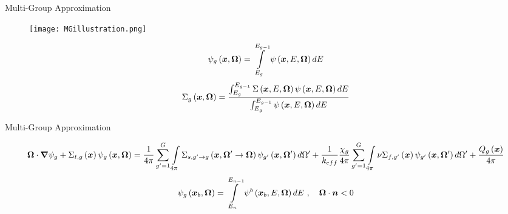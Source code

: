 
\begin{frame}[t]{Multi-Group Approximation}   
  
  \begin{figure}[h]
    \centering
    \texttt{[image: MGillustration.png]}
  \end{figure}
    \begin{equation*}
    \psi_g\left(\bm x, \bm \Omega\right) = \intop_{E_g}^{E_{g-1}} \psi\left(\bm 
    x, E, \bm \Omega\right) dE
    \end{equation*}
    \begin{equation*}
    \Sigma_g\left(\bm x, \bm \Omega\right) = \frac{\intop_{E_g}^{E_{g-1}} 
    \Sigma\left(\bm x, E, \bm \Omega\right) \psi\left(\bm x, E, \bm 
    \Omega\right) dE}{\intop_{E_g}^{E_{g-1}}  \psi\left(\bm x, E, \bm 
    \Omega\right) dE}
    \end{equation*}
  
 \end{frame} 
  
  
\begin{frame}[t]{Multi-Group Approximation}    
    
        \begin{dmath*}
            {\bm \Omega \cdot \bm \nabla \psi_g} + {\Sigma_{t,g}\left(\bm 
            x\right)\psi_g\left(\bm x,\bm \Omega\right)} = 
            {\frac{1}{4\pi}\sum_{g'=1}^G \intop_{4\pi} \Sigma_{s,g'\rightarrow 
            g}\left(\bm x,\bm \Omega' \rightarrow \bm \Omega\right) 
            \psi_{g'}\left(\bm x,\bm \Omega'\right) d\Omega'} + 
            {\frac{1}{k_{eff}}\frac{\chi_g}{4\pi} \sum_{g'=1}^{G} \intop_{4\pi} 
            \nu \Sigma_{f,g'}\left(\bm x\right) \psi_{g'}\left(\bm x,\bm 
            \Omega'\right)d\Omega' + \frac{Q_g\left(\bm x\right)}{4\pi}}
        \end{dmath*}
        \begin{equation*}\label{e:multigroupboltzmannBC}
        \psi_g\left(\bm x_b, \bm{\Omega}\right) = \intop_{E_n}^{E_{n-1}} \psi^b\left(\bm x_b, E, \bm{\Omega}\right)dE\ ,\quad \bm{\Omega}\cdot \bm n < 0
        \end{equation*}

\end{frame}


